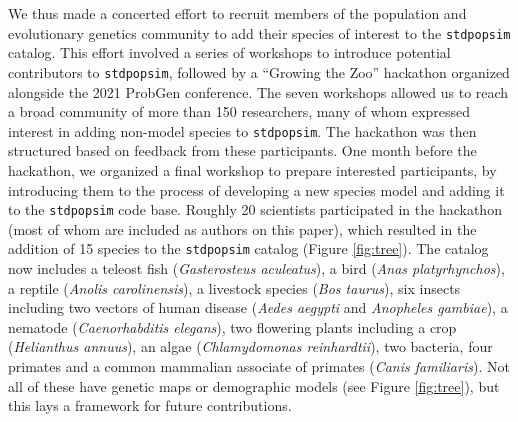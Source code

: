 \documentclass[hidelinks]{article}
\newcommand{\stdpopsim}{\texttt{stdpopsim}\xspace}
\begin{document}
We thus made a concerted effort
to recruit members of the population and evolutionary genetics community
to add their species of interest to the \stdpopsim catalog.
This effort involved a series of workshops to introduce potential contributors to \stdpopsim, followed by a ``Growing the Zoo'' hackathon organized alongside the 2021 ProbGen conference.
The seven workshops allowed us to reach a broad community of more than 150 researchers,
many of whom expressed interest in adding non-model species to \stdpopsim.
The hackathon was then structured based on feedback from these participants.
One month before the hackathon, we organized a final workshop to prepare interested
participants, by introducing them to  the process of developing
a new species model and adding it to the \stdpopsim code base.
Roughly 20 scientists participated in the hackathon (most of whom are included as authors on this paper),
which resulted in the addition of 15 species to the \stdpopsim catalog
(Figure \ref{fig:tree}).
The catalog now includes
a teleost fish (\textit{Gasterosteus aculeatus}),
a bird (\textit{Anas platyrhynchos}),
a reptile (\textit{Anolis carolinensis}),
a livestock species (\textit{Bos taurus}),
six insects including two vectors of human disease (\textit{Aedes aegypti} and \textit{Anopheles gambiae}),
a nematode (\textit{Caenorhabditis elegans}),
two flowering plants including a crop (\textit{Helianthus annuus}),
an algae (\textit{Chlamydomonas reinhardtii}),
two bacteria,
four primates and a common mammalian associate of primates (\textit{Canis familiaris}).
Not all of these have genetic maps or demographic models (see Figure \ref{fig:tree}),
but this lays a framework for future contributions.
\end{document}

